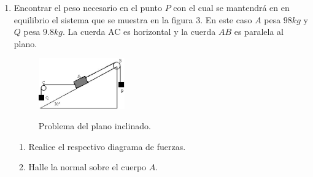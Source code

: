 \documentclass[letterpaper,10pt,onecolumn]{article}
\begin{document}
\begin{enumerate}
\item
Encontrar el peso necesario en el punto $P$ con el cual se mantendrá en en equilibrio el sistema que se muestra en la figura 3. En este caso $A$ pesa $98kg$ y $Q$ pesa $9.8kg$. La cuerda AC es horizontal y la cuerda $AB$ es paralela al plano.
\begin{figure}[h]
\centering
\includegraphics[width=0.35\textwidth]{complementaria02.jpg}\\
\caption{Problema del plano inclinado.}
\end{figure}
\begin{enumerate}
\item 
Realice el respectivo diagrama de fuerzas.
\item
Halle la normal sobre el cuerpo $A$. 
\end{enumerate}

\end{enumerate}
\end{document}
